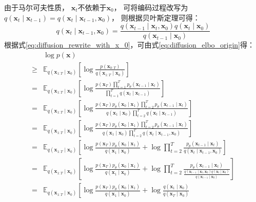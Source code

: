 由于马尔可夫性质，
{$\bm{x}_{t}$}不依赖于{$\bm{x}_{0}$}，
可将编码过程改写为{$q(\bm{x}_{t}\mid \bm{x}_{t-1})=q(\bm{x}_{t}\mid \bm{x}_{t-1},\bm{x}_{0})$}，
则根据贝叶斯定理可得：
\begin{equation}
    \label{eq:diffusion_rewrite_with_x_0}
    q(\bm{x}_{t}\mid \bm{x}_{t-1},\bm{x}_0)=\frac{q(\bm{x}_{t-1}\mid \bm{x}_{t},\bm{x}_0)q(\bm{x}_{t}\mid \bm{x}_0)}{q(\bm{x}_{t-1}\mid \bm{x}_0)}
\end{equation}
根据式{\ref{eq:diffusion_rewrite_with_x_0}}，可由式{\ref{eq:diffusion_elbo_origin}}得：
\begin{align}
    &\log p(\bm{x})
    \\\geq &  \mathbb{E}_{q(\bm{x}_{1:T}\mid \bm{x}_0)} \left[ \log \frac{p(\bm{x}_{0:T})}{q(\bm{x}_{1:T}\mid \bm{x}_{0})}  \right]
    \\= &  \mathbb{E}_{q(\bm{x}_{1:T}\mid \bm{x}_0)} \left[ \log \frac{p(\bm{x}_{T})\prod_{t=1}^{T}{p_{\theta}(\bm{x}_{t-1}\mid \bm{x}_{t})}}{\prod_{t=1}^{T}q(\bm{x}_{t}\mid \bm{x}_{t-1})}  \right]
    \\= &  \mathbb{E}_{q(\bm{x}_{1:T}\mid \bm{x}_0)} \left[ \log \frac{p(\bm{x}_{T})p_{\theta}(\bm{x}_{0}\mid \bm{x}_{1})\prod_{t=2}^{T}{p_{\theta}(\bm{x}_{t-1}\mid \bm{x}_{t})}}{q(\bm{x}_{1}\mid \bm{x}_{0})\prod_{t=2}^{T}q(\bm{x}_{t}\mid \bm{x}_{t-1})}  \right]
    \\= &  \mathbb{E}_{q(\bm{x}_{1:T}\mid \bm{x}_0)} \left[ \log \frac{p(\bm{x}_{T})p_{\theta}(\bm{x}_{0}\mid \bm{x}_{1})\prod_{t=2}^{T}{p_{\theta}(\bm{x}_{t-1}\mid \bm{x}_{t})}}{q(\bm{x}_{1}\mid \bm{x}_{0})\prod_{t=2}^{T}q(\bm{x}_{t}\mid \bm{x}_{t-1},\bm{x}_{0})}  \right]
    \\= &  \mathbb{E}_{q(\bm{x}_{1:T}\mid \bm{x}_0)} \left[ \log \frac{p(\bm{x}_{T})p_{\theta}(\bm{x}_{0}\mid \bm{x}_{1})}{q(\bm{x}_{1}\mid \bm{x}_{0})} 
     + \log \prod_{t=2}^{T}\frac{p_{\theta}(\bm{x}_{t-1}\mid \bm{x}_{t})}{q(\bm{x}_{t}\mid \bm{x}_{t-1},\bm{x}_{0})} \right]
    \\= &  \mathbb{E}_{q(\bm{x}_{1:T}\mid \bm{x}_0)} \left[ \log \frac{p(\bm{x}_{T})p_{\theta}(\bm{x}_{0}\mid \bm{x}_{1})}{q(\bm{x}_{1}\mid \bm{x}_{0})} 
    + \log \prod_{t=2}^{T}\frac{p_{\theta}(\bm{x}_{t-1}\mid \bm{x}_{t})}{\frac{q(\bm{x}_{t-1}\mid \bm{x}_{t},\bm{x}_0)q(\bm{x}_{t}\mid \bm{x}_0)}{q(\bm{x}_{t-1}\mid \bm{x}_0)}} \right]
   \\= & \mathbb{E}_{q(\bm{x}_{1:T}\mid \bm{x}_0)} \left[ \log \frac{p(\bm{x}_{T})p_{\theta}(\bm{x}_{0}\mid \bm{x}_{1})}{q(\bm{x}_{1}\mid \bm{x}_{0})} 
   + \log \frac{q(\bm{x}_{1}\mid \bm{x}_{0})}{q(\bm{x}_{T}\mid \bm{x}_{0})}

\end{align}
